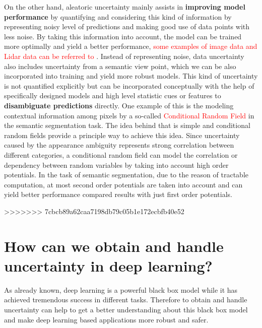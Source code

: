 On the other hand, aleatoric uncertainty mainly assists in \textbf{improving model performance} by quantifying and considering this kind of information by representing noisy level of predictions and making good use of data points with less noise. By taking this information into account, the model can be trained more optimally and yield a better performance, \textcolor{red}{some examples of image data and Lidar data can be referred to \cite{kendall2016modelling}\cite{feng2018towards}}.
Instead of representing noise, data uncertainty also includes uncertainty from a semantic view point, which we can be also incorporated into training and yield more robust models. This kind of uncertainty is not quantified explicitly but can be incorporated conceptually with the help of specifically designed models and high level statistic cues or features to \textbf{disambiguate predictions} directly. One example of this is the modeling contextual information among pixels by a so-called \textcolor{red}{Conditional Random Field}  in the semantic segmentation task\cite{krahenbuhl2011efficient}\cite{sutton2012introduction}\cite{lin2016efficient}. The idea behind that is simple and conditional random fields provide a principle way to achieve this idea. Since uncertainty caused by the appearance ambiguity represents strong correlation between different categories, a conditional random field can model the correlation or dependency between random variables by taking into account high order potentials. In the task of semantic segmentation, due to the reason of tractable computation, at most second order potentials are taken into account and can yield better performance compared results with just first order potentials. 

\newpage
>>>>>>> 7cbcb89a62caa7198db79c05b1e172ecbfb40e52

\section{How can we obtain and handle uncertainty in deep learning?}
As already known, deep learning is a powerful black box model while it has achieved tremendous success in different tasks. Therefore to obtain and handle uncertainty can help to get a better understanding about this black box model and make deep learning based applications more robust and safer. 

